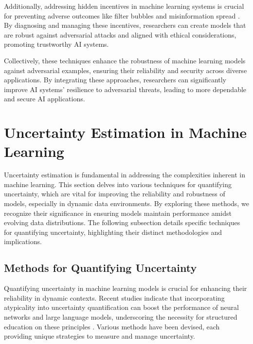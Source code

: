 Additionally, addressing hidden incentives in machine learning systems is crucial for preventing adverse outcomes like filter bubbles and misinformation spread \cite{krueger2020hiddenincentivesautoinduceddistributional}. By diagnosing and managing these incentives, researchers can create models that are robust against adversarial attacks and aligned with ethical considerations, promoting trustworthy AI systems.

Collectively, these techniques enhance the robustness of machine learning models against adversarial examples, ensuring their reliability and security across diverse applications. By integrating these approaches, researchers can significantly improve AI systems' resilience to adversarial threats, leading to more dependable and secure AI applications.











\section{Uncertainty Estimation in Machine Learning} \label{sec:Uncertainty Estimation in Machine Learning}

Uncertainty estimation is fundamental in addressing the complexities inherent in machine learning. This section delves into various techniques for quantifying uncertainty, which are vital for improving the reliability and robustness of models, especially in dynamic data environments. By exploring these methods, we recognize their significance in ensuring models maintain performance amidst evolving data distributions. The following subsection details specific techniques for quantifying uncertainty, highlighting their distinct methodologies and implications.


\subsection{Methods for Quantifying Uncertainty} \label{subsec:Methods for Quantifying Uncertainty}

Quantifying uncertainty in machine learning models is crucial for enhancing their reliability in dynamic contexts. Recent studies indicate that incorporating atypicality into uncertainty quantification can boost the performance of neural networks and large language models, underscoring the necessity for structured education on these principles \cite{yuksekgonul2023confidencereliablemodelsconsider,valdenegrotoro2021teachinguncertaintyquantificationmachine}. Various methods have been devised, each providing unique strategies to measure and manage uncertainty. 

